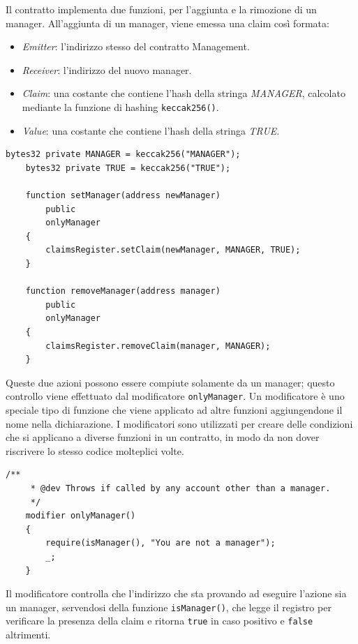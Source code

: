 Il contratto implementa due funzioni, per l'aggiunta e la rimozione di un manager. All'aggiunta di un manager, viene emessa una claim così formata:
\begin{itemize}
    \item \emph{Emitter}: l'indirizzo stesso del contratto Management.
    \item \emph{Receiver}: l'indirizzo del nuovo manager.
    \item \emph{Claim}: una costante che contiene l'hash della stringa \emph{MANAGER}, calcolato mediante la funzione di hashing \texttt{keccak256()}.
    \item \emph{Value}: una costante che contiene l'hash della stringa \emph{TRUE}.
\end{itemize}

\noindent
\begin{lstlisting}[language=Solidity]
    bytes32 private MANAGER = keccak256("MANAGER");
    bytes32 private TRUE = keccak256("TRUE");

    function setManager(address newManager)
        public
        onlyManager
    {
        claimsRegister.setClaim(newManager, MANAGER, TRUE);
    }

    function removeManager(address manager)
        public
        onlyManager
    {
        claimsRegister.removeClaim(manager, MANAGER);
    }
\end{lstlisting}

Queste due azioni possono essere compiute solamente da un manager; questo controllo viene effettuato dal modificatore \texttt{onlyManager}. Un modificatore è uno speciale tipo di funzione che viene applicato ad altre funzioni aggiungendone il nome nella dichiarazione. I modificatori sono utilizzati per creare delle condizioni che si applicano a diverse funzioni in un contratto, in modo da non dover riscrivere lo stesso codice molteplici volte.

\noindent
\begin{lstlisting}[language=Solidity]
    /**
     * @dev Throws if called by any account other than a manager.
     */
    modifier onlyManager()
    {
        require(isManager(), "You are not a manager");
        _;
    }
\end{lstlisting}

Il modificatore controlla che l'indirizzo che sta provando ad eseguire l'azione sia un manager, servendosi della funzione \texttt{isManager()}, che legge il registro per verificare la presenza della claim e ritorna \texttt{true} in caso positivo e \texttt{false} altrimenti.

